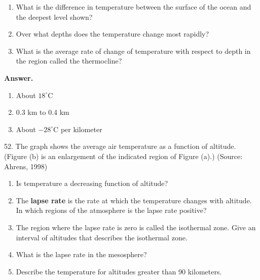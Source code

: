 \documentclass[10pt,]{book}
\newcommand{\terminology}[1]{\textbf{#1}}
\theoremstyle{plain}
\theoremstyle{definition}
\theoremstyle{definition}
\theoremstyle{definition}
\theoremstyle{definition}
\numberwithin{equation}{part}
\newcommand\degree[0]{^{\circ}}
\begin{document}
\begin{exerciselist}
 \leavevmode%
\begin{enumerate}[label=*\alph**]
\item\hypertarget{li-1049}{}What is the difference in temperature between the surface of the ocean and the deepest level shown?%
\item\hypertarget{li-1050}{}Over what depths does the temperature change most rapidly?%
\item\hypertarget{li-1051}{}What is the average rate of change of temperature with respect to depth in the region called the thermocline?%
\end{enumerate}
%
\par\smallskip
\par\smallskip
\noindent\textbf{Answer.}\hypertarget{answer-151}{}\quad
\leavevmode%
\begin{enumerate}[label=*\alph**]
\item\hypertarget{li-1052}{}About \(18\degree\)C%
\item\hypertarget{li-1053}{}0.3 km to 0.4 km%
\item\hypertarget{li-1054}{}About \(-28\degree\)C per kilometer%
\end{enumerate}
%
\item[52.]\hypertarget{exercise-267}{}The graph shows the average air temperature as a function of altitude. (Figure (b) is an enlargement of the indicated region of Figure (a).) (Source: Ahrens, 1998) \leavevmode%
\begin{enumerate}[label=*\alph**]
\item\hypertarget{li-1055}{}Is temperature a decreasing function of altitude?%
\item\hypertarget{li-1056}{}The \terminology{lapse rate} is the rate at which the temperature changes with altitude. In which regions of the atmosphere is the lapse rate positive?%
\item\hypertarget{li-1057}{}The region where the lapse rate is zero is called the isothermal zone. Give an interval of altitudes that describes the isothermal zone.%
\item\hypertarget{li-1058}{}What is the lapse rate in the mesosphere?%
\item\hypertarget{li-1059}{}Describe the temperature for altitudes greater than 90 kilometers.%
\end{enumerate}

\end{exerciselist}
\end{document}
